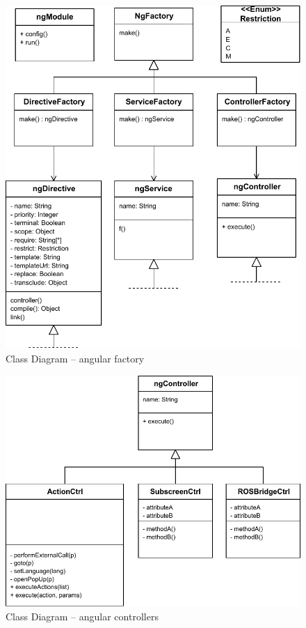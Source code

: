 \begin{figure}[htb]
    \centering
    \includegraphics{figures/design-class-ngfactory.pdf}
    \caption{Class Diagram -- angular factory}
    \label{fig:class-ngfactory}
\end{figure}

\begin{figure}[htb]
    \centering
    \includegraphics{figures/design-class-controllers.pdf}
    \caption{Class Diagram -- angular controllers}
    \label{fig:class-controllers}
\end{figure}

